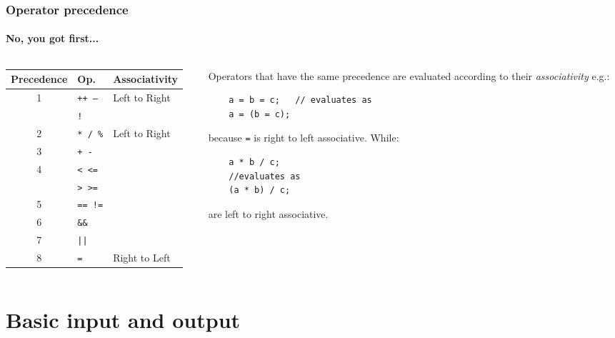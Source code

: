 \documentclass{beamer}
\begin{document}
\begin{frame}[fragile]
  \frametitle{Operator precedence}
  \framesubtitle{No, you got first...}
  \begin{columns}[t]
	  \begin{column}[T]{0.44\textwidth}
		  \begin{tabular}{c|l|m{2.1cm}}
			  Precedence & Op. & Associativity \\
			  \hline
			  \multirow{2}{*}{1} & \texttt{++ --} & \multirow{2}{*}{Left to Right}\\
			    & \texttt{!} \\
			  \hline
			  2 & \texttt{* / \%} & \multirow{6}{*}{Left to Right} \\
			  \cline{1-2}
			  3 & \texttt{+ -} & \\
			  \cline{1-2}
			  \multirow{2}{*}{4} & \texttt{< <=} \\
			    & \texttt{> >=} \\
			  \cline{1-2}
			  5 & \texttt{== !=} \\
			  \cline{1-2}
			  6 & \texttt{\&\&} \\
			  \cline{1-2}
			  7 & \texttt{||} \\
			  \hline
			  8 & \texttt{=} & Right to Left
		  \end{tabular}
	 	\end{column}
	  \begin{column}[T]{0.38\textwidth}
	     Operators that have the same precedence are evaluated according to their \textit{associativity} e.g.:
	    \begin{lstlisting}
	a = b = c;   // evaluates as
	a = (b = c);
	    \end{lstlisting}
			because \texttt{=} is right to left associative. 
			\pause  While:
	    \begin{lstlisting}
	a * b / c;
	//evaluates as
	(a * b) / c;
	    \end{lstlisting}
	 are left to right associative. 
	    
	  \end{column}
	\end{columns}
\end{frame}


\section{Basic input and output}
\end{document}
